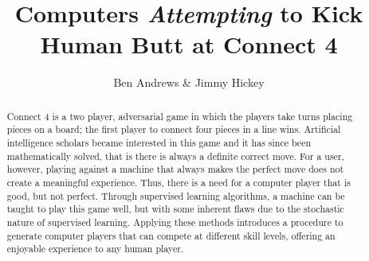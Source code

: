 \documentclass[]{article}
\title{Computers \textit{Attempting} to Kick Human Butt at Connect 4}
\author{Ben Andrews \& Jimmy Hickey}
\begin{document}
	\maketitle
\begin{abstract}
	Connect 4 is a two player, adversarial game in which the players take turns placing pieces on a board; the first player to connect four pieces in a line wins. Artificial intelligence scholars became interested in this game and it has since been mathematically solved, that is there is always a definite correct move. For a user, however, playing against a machine that always makes the perfect move does not create a meaningful experience. Thus, there is a need for a computer player that is good, but not perfect. Through supervised learning algorithms, a machine can be taught to play this game well, but with some inherent flaws due to the stochastic nature of supervised learning. Applying these methods introduces a procedure to generate computer players that can compete at different skill levels, offering an enjoyable experience to any human player.
\end{abstract}
\end{document}
